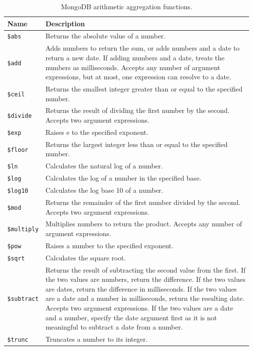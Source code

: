 \begin{table}[!htb]
	\centering \caption{MongoDB arithmetic aggregation functions.}\label{tab:mongodb_arithmetic_aggregation}
	\begin{tabularx}{\textwidth}{lX}
		\hline
		Name & Description \\ \hline
		\verb|$abs| &	Returns the absolute value of a number. \\
		\verb|$add| &	Adds numbers to return the sum, or adds numbers and a date to return a new date. If adding numbers and a date, treats the numbers as milliseconds. Accepts any number of argument expressions, but at most, one expression can resolve to a date. \\
		\verb|$ceil| &	Returns the smallest integer greater than or equal to the specified number. \\
		\verb|$divide| &	Returns the result of dividing the first number by the second. Accepts two argument expressions. \\
		\verb|$exp| &	Raises e to the specified exponent. \\
		\verb|$floor| &	Returns the largest integer less than or equal to the specified number. \\
		\verb|$ln| &	Calculates the natural log of a number. \\
		\verb|$log| &	Calculates the log of a number in the specified base. \\
		\verb|$log10| &	Calculates the log base 10 of a number. \\
		\verb|$mod| &	Returns the remainder of the first number divided by the second. Accepts two argument expressions. \\
		\verb|$multiply| &	Multiplies numbers to return the product. Accepts any number of argument expressions. \\
		\verb|$pow| &	Raises a number to the specified exponent. \\
		\verb|$sqrt| &	Calculates the square root. \\
		\verb|$subtract| &	Returns the result of subtracting the second value from the first. If the two values are numbers, return the difference. If the two values are dates, return the difference in milliseconds. If the two values are a date and a number in milliseconds, return the resulting date. Accepts two argument expressions. If the two values are a date and a number, specify the date argument first as it is not meaningful to subtract a date from a number. \\
		\verb|$trunc| &	Truncates a number to its integer. \\
		\hline
	\end{tabularx}
\end{table}


